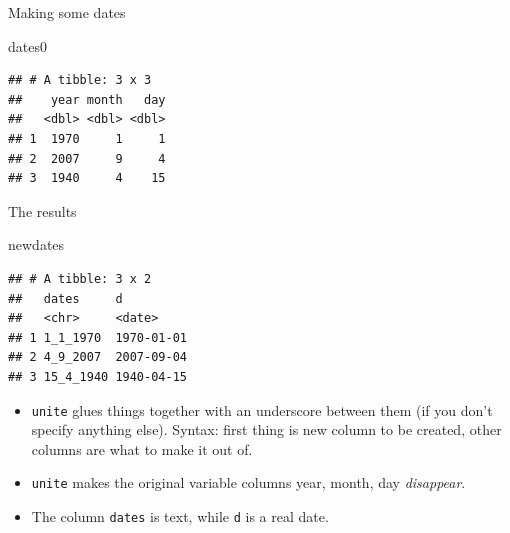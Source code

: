 \documentclass[
  ignorenonframetext,
]{beamer}
\newenvironment{Shaded}{\begin{snugshade}}{\end{snugshade}}
\newcommand{\DataTypeTok}[1]{\textcolor[rgb]{0.13,0.29,0.53}{#1}}
\newcommand{\KeywordTok}[1]{\textcolor[rgb]{0.13,0.29,0.53}{\textbf{#1}}}
\newcommand{\NormalTok}[1]{#1}
\newcommand{\OperatorTok}[1]{\textcolor[rgb]{0.81,0.36,0.00}{\textbf{#1}}}
\newcommand{\StringTok}[1]{\textcolor[rgb]{0.31,0.60,0.02}{#1}}
\providecommand{\tightlist}{%
  \setlength{\itemsep}{0pt}\setlength{\parskip}{0pt}}
\begin{document}
\begin{frame}[fragile]{Making some dates}
\protect\hypertarget{making-some-dates}{}

\begin{Shaded}
\begin{Highlighting}[]
\NormalTok{dates0}
\end{Highlighting}
\end{Shaded}

\begin{verbatim}
## # A tibble: 3 x 3
##    year month   day
##   <dbl> <dbl> <dbl>
## 1  1970     1     1
## 2  2007     9     4
## 3  1940     4    15
\end{verbatim}

\begin{Shaded}
\end{Shaded}

\end{frame}

\begin{frame}[fragile]{The results}
\protect\hypertarget{the-results}{}

\begin{Shaded}
\begin{Highlighting}[]
\NormalTok{newdates}
\end{Highlighting}
\end{Shaded}

\begin{verbatim}
## # A tibble: 3 x 2
##   dates     d         
##   <chr>     <date>    
## 1 1_1_1970  1970-01-01
## 2 4_9_2007  2007-09-04
## 3 15_4_1940 1940-04-15
\end{verbatim}

\begin{itemize}
\tightlist
\item
  \texttt{unite} glues things together with an underscore between them
  (if you don't specify anything else). Syntax: first thing is new
  column to be created, other columns are what to make it out of.
\item
  \texttt{unite} makes the original variable columns year, month, day
  \emph{disappear}.
\item
  The column \texttt{dates} is text, while \texttt{d} is a real date.
\end{itemize}

\end{frame}
\end{document}
